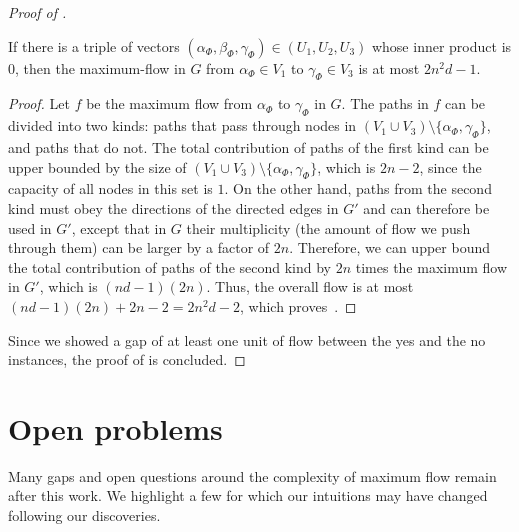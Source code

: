 \documentclass{toc}
\theoremstyle{plain}
\begin{document}
\begin{proof}[Proof of ]
\begin{claim}\label{claim:second}
If there is a triple of vectors $(\alpha_{\Phi}, \beta_{\Phi}, \gamma_{\Phi})\in (U_1, U_2, U_3)$ whose inner product is $0$, then the maximum-flow in $G$ from $\alpha_{\Phi} \in V_1$ to $\gamma_{\Phi} \in V_3$ is at most $2n^2d -1$.
\end{claim}
\begin{proof}
Let $f$ be the maximum flow from $\alpha_{\Phi}$ to $\gamma_{\Phi}$ in $G$.
The paths in $f$ can be divided into two kinds: paths that pass through nodes in $(V_1\cup V_3)\setminus \{\alpha_{\Phi},\gamma_{\Phi}\}$, and paths that do not.
The total contribution of paths of the first kind can be upper bounded by the size of $(V_1\cup V_3)\setminus \{\alpha_{\Phi},\gamma_{\Phi}\}$, which is $2n-2$, since the capacity of all nodes in this set is $1$.
On the other hand, paths from the second kind must obey the directions of the directed edges in $G'$ and can therefore be used in $G'$, except that in $G$ their multiplicity (the amount of flow we push through them) can be larger by a factor of $2n$.
Therefore, we can upper bound the total contribution of paths of the second kind by $2n$ times the maximum flow in $G'$, which is $(nd-1)(2n)$.
Thus, the overall flow is at most $(nd-1)(2n)+2n-2=2n^2d-2$, which proves~.
\end{proof}
Since we showed a gap of at least one unit of flow between the yes and the no instances, the proof of  is concluded.
\end{proof}



\section{Open problems}\label{Section:Conclusion}

Many gaps and open questions around the complexity of maximum flow remain after this work. We highlight a few for which our intuitions may have changed following our discoveries.
\end{document}
